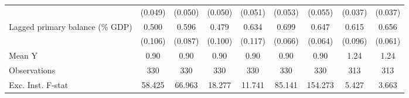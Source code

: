 {\begin{tabular}{l*{8}{c}}
                    &     (0.049)         &     (0.050)         &     (0.050)         &     (0.051)         &     (0.053)         &     (0.055)         &     (0.037)         &     (0.037)         \\
\addlinespace
Lagged primary balance (\% GDP)&       0.500\sym{***}&       0.596\sym{***}&       0.479\sym{***}&       0.634\sym{***}&       0.699\sym{***}&       0.647\sym{***}&       0.615\sym{***}&       0.656\sym{***}\\
                    &     (0.106)         &     (0.087)         &     (0.100)         &     (0.117)         &     (0.066)         &     (0.064)         &     (0.096)         &     (0.061)         \\
\midrule
Mean Y              &        0.90         &        0.90         &        0.90         &        0.90         &        0.90         &        0.90         &        1.24         &        1.24         \\
Observations        &         330         &         330         &         330         &         330         &         330         &         330         &         313         &         313         \\
Exc. Inst. F-stat   &      58.425         &      66.963         &      18.277         &      11.741         &      85.141         &     154.273         &       5.427         &       3.663         \\
\bottomrule
\end{tabular}
}
